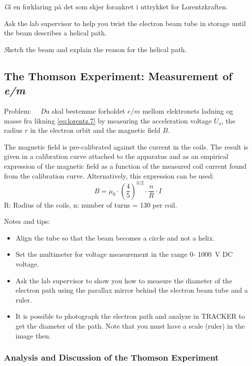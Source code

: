 \documentclass[../Elmag-labhefte-2020.tex]{subfiles}
\begin{document}
{\emph Gi en forklaring på det som skjer forankret i uttrykket for Lorentzkraften. }

Ask the lab supervisor to help you twist the electron beam tube in storage until the beam describes a helical path.

{\emph Sketch the beam and explain the reason for the helical path.}

\subsection{The Thomson Experiment: Measurement of \textsl{e/m}}

Problem: \ \
{\emph Du skal bestemme forholdet $e/m$ mellom elektronets ladning og masse fra likning \eqref{eq:lorentz.7} by measuring the acceleration voltage $U_\mathrm{a}$, the radius $r$ in the electron orbit and the magnetic field $B$.}

The magnetic field is pre-calibrated against the current in the coils. The result is given in a calibration curve attached to the apparatus and as an empirical expression of the magnetic field as a function of the measured coil current found from the calibration curve. Alternatively, this expression can be used:
\begin{equation}
    B=\mu_0 \cdot (\frac{4}{5})^{3/2}\cdot \frac{n}{R} \cdot I
\end{equation}
R: Radius of the coils, n: number of turns = 130 per coil.

Notes and tips:
\vspace{-4mm}
\begin{itemize}
    \item Align the tube so that the beam becomes a circle and not a helix.
    \item Set the multimeter for voltage measurement in the range 0- \SI{1000}{\volt} DC voltage.
    \item Ask the lab supervisor to show you how to measure the diameter of the electron path using the parallax mirror behind the electron beam tube and a ruler.
    \item It is possible to photograph the electron path and analyze in TRACKER to get the diameter of the path. Note that you must have a scale (ruler) in the image then.
\end{itemize}

\subsubsection{Analysis and Discussion of the Thomson Experiment}
\end{document}
